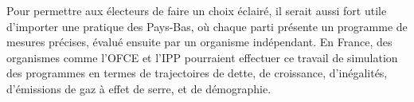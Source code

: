 \documentclass[12pt,french]{article}
\begin{document}
Pour permettre aux électeurs de faire un choix éclairé, il serait aussi fort utile d'importer une pratique des Pays-Bas, où chaque parti présente un programme de mesures précises, évalué ensuite par un organisme indépendant. En France, des organismes comme l'OFCE et l'IPP pourraient effectuer ce travail de simulation des programmes en termes de trajectoires de dette, de croissance, d'inégalités, d'émissions de gaz à effet de serre, et de démographie.

\end{document}

